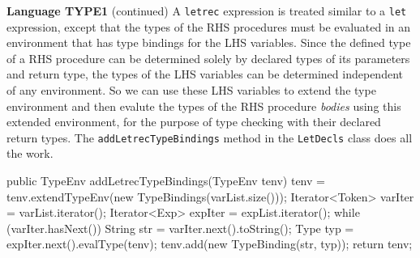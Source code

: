 \begin{minipage}[t]{\sw}
\slidenumber
\LARGE
{\bf Language TYPE1} (continued)\exx
A \verb'letrec' expression is treated similar
to a \verb'let' expression,
except that the types of the RHS procedures
must be evaluated in an environment
that has type bindings for the LHS variables.
Since the defined type of a RHS procedure can be determined
solely by declared types of its parameters and return type,
the types of the LHS variables can be determined
independent of any environment.
So we can use these LHS variables to extend
the type environment
and then evalute the types of the RHS procedure {\em bodies}
using this extended environment,
for the purpose of type checking with their declared return types.
The \verb'addLetrecTypeBindings' method in the \verb'LetDecls' class
does all the work.
{\Large
\begin{qv}
public TypeEnv addLetrecTypeBindings(TypeEnv tenv) {
    tenv = tenv.extendTypeEnv(new TypeBindings(varList.size()));
    Iterator<Token> varIter = varList.iterator();
    Iterator<Exp> expIter = expList.iterator();
    while (varIter.hasNext()) {
        String str = varIter.next().toString();
        Type typ = expIter.next().evalType(tenv);
        tenv.add(new TypeBinding(str, typ));
    }
    return tenv;
}
\end{qv}
}
\end{minipage}
